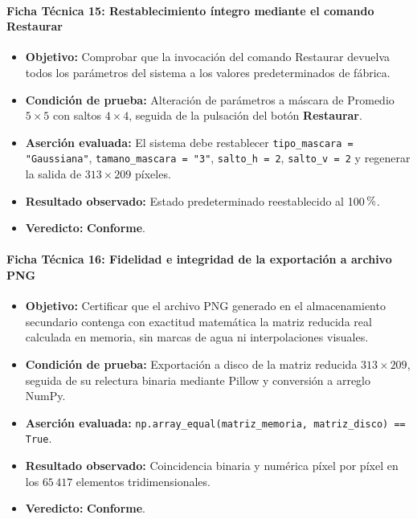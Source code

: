 \documentclass[11pt]{article}
\newcommand{\pct}{\ensuremath{\mathrm{\char37}}}
\newcommand{\pruebaok}{\textcolor{verdeExito}{\textbf{Conforme}}}
\begin{document}
\paragraph{Ficha Técnica 15: Restablecimiento íntegro mediante el comando Restaurar}
\begin{itemize}[itemsep=0.15em]
\item \textbf{Objetivo:} Comprobar que la invocación del comando Restaurar devuelva todos los parámetros del sistema a los valores predeterminados de fábrica.
\item \textbf{Condición de prueba:} Alteración de parámetros a máscara de Promedio $5\times5$ con saltos $4\times4$, seguida de la pulsación del botón \textbf{Restaurar}.
\item \textbf{Aserción evaluada:} El sistema debe restablecer \texttt{tipo\_mascara = "Gaussiana"}, \texttt{tamano\_mascara = "3"}, \texttt{salto\_h = 2}, \texttt{salto\_v = 2} y regenerar la salida de $313 \times 209$ píxeles.
\item \textbf{Resultado observado:} Estado predeterminado reestablecido al 100\,\pct.
\item \textbf{Veredicto:} \pruebaok.
\end{itemize}

\paragraph{Ficha Técnica 16: Fidelidad e integridad de la exportación a archivo PNG}
\begin{itemize}[itemsep=0.15em]
\item \textbf{Objetivo:} Certificar que el archivo PNG generado en el almacenamiento secundario contenga con exactitud matemática la matriz reducida real calculada en memoria, sin marcas de agua ni interpolaciones visuales.
\item \textbf{Condición de prueba:} Exportación a disco de la matriz reducida $313 \times 209$, seguida de su relectura binaria mediante Pillow y conversión a arreglo NumPy.
\item \textbf{Aserción evaluada:} \texttt{np.array\_equal(matriz\_memoria, matriz\_disco) == True}.
\item \textbf{Resultado observado:} Coincidencia binaria y numérica píxel por píxel en los $65\,417$ elementos tridimensionales.
\item \textbf{Veredicto:} \pruebaok.
\end{itemize}
\end{document}
